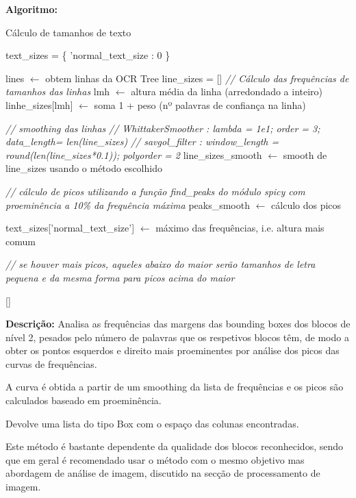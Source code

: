\textbf{Algoritmo:}
\begin{breakablealgorithm}
	\caption{Cálculo de tamanhos de texto}
	\begin{algorithmic}[1]
		
		\State text\_sizes = \{
			'normal\_text\_size : 0
		\}
		
		\State lines $\leftarrow$ obtem linhas da OCR Tree
		\State line\_sizes = []
		\State \textit{// Cálculo das frequências de tamanhos das linhas}
				\State lmh $\leftarrow$ altura média da linha (arredondado a inteiro)
				\State linhe\_sizes[lmh] $\leftarrow$ soma 1 + peso (nº palavras de confiança na linha)
			\EndIf
		\EndFor
		
		\State \textit{// smoothing das linhas}
		\State \textit{// WhittakerSmoother : lambda = 1e1; order = 3; data\_length= len(line\_sizes)}
		\State \textit{// savgol\_filter : window\_length = round(len(line\_sizes*0.1)); polyorder = 2}
		\State line\_sizes\_smooth $\leftarrow$ smooth de line\_sizes usando o método escolhido
		
		\State \textit{// cálculo de picos utilizando a função find\_peaks do módulo spicy com proeminência a 10\% da frequência máxima}
		\State peaks\_smooth $\leftarrow$ cálculo dos picos
		
		\State text\_sizes['normal\_text\_size'] $\leftarrow$ máximo das frequências, i.e. altura mais comum
		
		\State \textit{// se houver mais picos, aqueles abaixo do maior serão tamanhos de letra pequena e da mesma forma para picos acima do maior}
		
	\end{algorithmic}
\end{breakablealgorithm}


[\normalsize]

\textbf{Descrição:} Analisa as frequências das margens das bounding boxes dos blocos de nível 2, pesados pelo número de palavras que os respetivos blocos têm, de modo a obter os pontos esquerdos e direito mais proeminentes por análise dos picos das curvas de frequências.

A curva é obtida a partir de um smoothing da lista de frequências e os picos são calculados baseado em proeminência.

Devolve uma lista do tipo Box com o espaço das colunas encontradas.

Este método é bastante dependente da qualidade dos blocos reconhecidos, sendo que em geral é recomendado usar o método com o mesmo objetivo mas abordagem de análise de imagem, discutido na secção de processamento de imagem.

